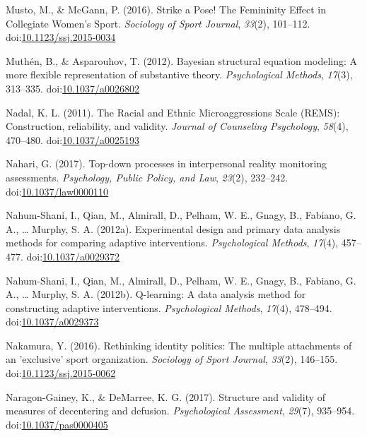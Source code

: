 \documentclass[english,man]{apa6}
\theoremstyle{definition}
\theoremstyle{definition}
\theoremstyle{definition}
\theoremstyle{remark}
\begin{document}
\hypertarget{ref-Musto2016}{}
Musto, M., \& McGann, P. (2016). Strike a Pose! The Femininity Effect in
Collegiate Women's Sport. \emph{Sociology of Sport Journal},
\emph{33}(2), 101--112.
doi:\href{https://doi.org/10.1123/ssj.2015-0034}{10.1123/ssj.2015-0034}

\hypertarget{ref-Muthen2012}{}
Muthén, B., \& Asparouhov, T. (2012). Bayesian structural equation
modeling: A more flexible representation of substantive theory.
\emph{Psychological Methods}, \emph{17}(3), 313--335.
doi:\href{https://doi.org/10.1037/a0026802}{10.1037/a0026802}

\hypertarget{ref-Nadal2011}{}
Nadal, K. L. (2011). The Racial and Ethnic Microaggressions Scale
(REMS): Construction, reliability, and validity. \emph{Journal of
Counseling Psychology}, \emph{58}(4), 470--480.
doi:\href{https://doi.org/10.1037/a0025193}{10.1037/a0025193}

\hypertarget{ref-Nahari2017}{}
Nahari, G. (2017). Top-down processes in interpersonal reality
monitoring assessments. \emph{Psychology, Public Policy, and Law},
\emph{23}(2), 232--242.
doi:\href{https://doi.org/10.1037/law0000110}{10.1037/law0000110}

\hypertarget{ref-Nahum-Shani2012a}{}
Nahum-Shani, I., Qian, M., Almirall, D., Pelham, W. E., Gnagy, B.,
Fabiano, G. A., \ldots{} Murphy, S. A. (2012a). Experimental design and
primary data analysis methods for comparing adaptive interventions.
\emph{Psychological Methods}, \emph{17}(4), 457--477.
doi:\href{https://doi.org/10.1037/a0029372}{10.1037/a0029372}

\hypertarget{ref-Nahum-Shani2012}{}
Nahum-Shani, I., Qian, M., Almirall, D., Pelham, W. E., Gnagy, B.,
Fabiano, G. A., \ldots{} Murphy, S. A. (2012b). Q-learning: A data
analysis method for constructing adaptive interventions.
\emph{Psychological Methods}, \emph{17}(4), 478--494.
doi:\href{https://doi.org/10.1037/a0029373}{10.1037/a0029373}

\hypertarget{ref-Nakamura2016}{}
Nakamura, Y. (2016). Rethinking identity politics: The multiple
attachments of an 'exclusive' sport organization. \emph{Sociology of
Sport Journal}, \emph{33}(2), 146--155.
doi:\href{https://doi.org/10.1123/ssj.2015-0062}{10.1123/ssj.2015-0062}

\hypertarget{ref-Naragon-Gainey2017}{}
Naragon-Gainey, K., \& DeMarree, K. G. (2017). Structure and validity of
measures of decentering and defusion. \emph{Psychological Assessment},
\emph{29}(7), 935--954.
doi:\href{https://doi.org/10.1037/pas0000405}{10.1037/pas0000405}
\end{document}
